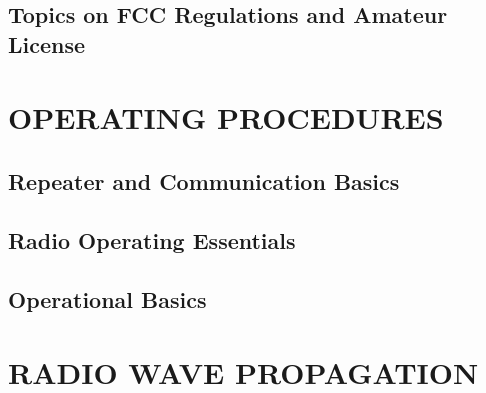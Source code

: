 \documentclass[12pt]{book}
\begin{document}
\section{Topics on FCC Regulations and Amateur License}











\chapter{OPERATING PROCEDURES }
\section{Repeater and Communication Basics}












\section{Radio Operating Essentials}













\section{Operational Basics}











\chapter{RADIO WAVE PROPAGATION}
\end{document}
